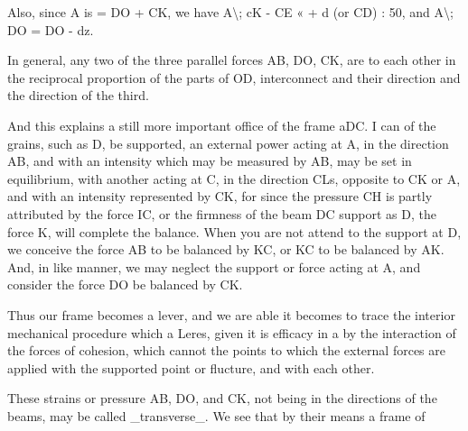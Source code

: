 Also, since A is = DO + CK, we have A\textbackslash{}; cK - CE « + d (or CD) : 50, and A\textbackslash{}; DO = DO - dz.\par\medskip
In general, any two of the three parallel forces AB, DO, CK, are to each other in the reciprocal proportion of the parts of OD, interconnect and their direction and the direction of the third.\par\medskip
And this explains a still more important office of the frame aDC. I can of the grains, such as D, be supported, an external power acting at A, in the direction AB, and with an intensity which may be measured by AB, may be set in equilibrium, with another acting at C, in the direction CLs, opposite to CK or A, and with an intensity represented by CK, for since the pressure CH is partly attributed by the force IC, or the firmness of the beam DC support as D, the force K, will complete the balance. When you are not attend to the support at D, we conceive the force AB to be balanced by KC, or KC to be balanced by AK. And, in like manner, we may neglect the support or force acting at A, and consider the force DO be balanced by CK.\par\medskip
Thus our frame becomes a lever, and we are able it becomes to trace the interior mechanical procedure which a Leres, given it is efficacy in a by the interaction of the forces of cohesion, which cannot the points to which the external forces are applied with the supported point or flucture, and with each other.\par\medskip
These strains or pressure AB, DO, and CK, not being in the directions of the beams, may be called \_transverse\_. We see that by their means a frame of\par\medskip
